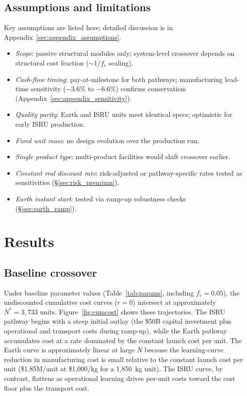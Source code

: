 \documentclass[preprint,12pt]{elsarticle}
\begin{document}
\subsection{Assumptions and limitations}

Key assumptions are listed here; detailed discussion is in Appendix~\ref{sec:appendix_assumptions}.
\begin{itemize}
  \item \emph{Scope}: passive structural modules only; system-level crossover depends on structural cost fraction ($\sim$$1/f_c$ scaling).
  \item \emph{Cash-flow timing}: pay-at-milestone for both pathways; manufacturing lead-time sensitivity ($-$3.6\% to $-$6.6\%) confirms conservatism (Appendix~\ref{sec:appendix_sensitivity}).
  \item \emph{Quality parity}: Earth and ISRU units meet identical specs; optimistic for early ISRU production.
  \item \emph{Fixed unit mass}: no design evolution over the production run.
  \item \emph{Single product type}: multi-product facilities would shift crossover earlier.
  \item \emph{Constant real discount rate}: risk-adjusted or pathway-specific rates tested as sensitivities (\S\ref{sec:risk_premium}).
  \item \emph{Earth instant start}: tested via ramp-up robustness checks (\S\ref{sec:earth_ramp}).
\end{itemize}

\section{Results}
\label{sec:results}

\subsection{Baseline crossover}

Under baseline parameter values (Table~\ref{tab:params}, including $f_v = 0.05$), the undiscounted cumulative cost curves ($r = 0$) intersect at approximately $N^* = 3{,}733$ units. Figure~\ref{fig:cumcost} shows these trajectories. The ISRU pathway begins with a steep initial outlay (the \$50B capital investment plus operational and transport costs during ramp-up), while the Earth pathway accumulates cost at a rate dominated by the constant launch cost per unit. The Earth curve is approximately linear at large $N$ because the learning-curve reduction in manufacturing cost is small relative to the constant launch cost per unit (\$1.85M/unit at \$1{,}000/kg for a 1{,}850~kg unit). The ISRU curve, by contrast, flattens as operational learning drives per-unit costs toward the cost floor plus the transport cost.
\end{document}
